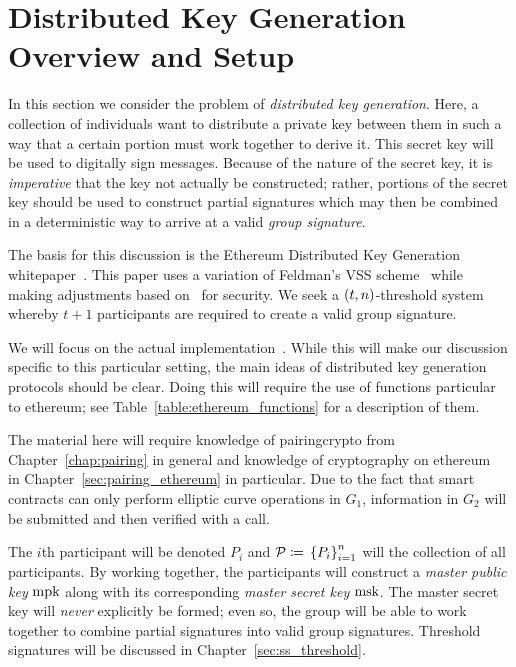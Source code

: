 \section{Distributed Key Generation Overview and Setup}
\label{sec:ss_dkg}

In this section we consider the problem of
\emph{\gls{distributed key generation}}.
Here, a collection of individuals want to distribute a private key
between them in such a way that a certain portion must work
together to derive it.
This secret key will be used to digitally sign messages.
Because of the nature of the secret key,
it is \emph{imperative} that the key not actually be constructed;
rather, portions of the secret key should be used to construct
partial signatures which may then be combined in a deterministic way
to arrive at a valid \emph{group signature}.

The basis for this discussion is the Ethereum Distributed Key Generation
whitepaper~\cite{ethdkg}.
This paper uses a variation of 
Feldman's VSS scheme~\cite{feldman1987practical}
while making adjustments
based on~\cite{gennaro1999secure,gennaro2002revisiting} for security.
We seek a $\left( t,n \right)$-threshold system
whereby $t+1$ participants are required to create a valid group signature.

We will focus on the actual implementation~\cite[Section 7]{ethdkg}.
While this will make our discussion specific to this particular setting,
the main ideas of \gls{distributed key generation} protocols should be clear.
Doing this will require the use of functions particular to \gls{ethereum};
see Table~\ref{table:ethereum_functions} for a description of them.

The material here will require knowledge of
\gls{pairingcrypto} from Chapter~\ref{chap:pairing} in general
and knowledge of cryptography on \gls{ethereum}~\cite{EthereumYellowpaper}
in Chapter~\ref{sec:pairing_ethereum} in particular.
Due to the fact that \glspl{smart contract} can only perform
\gls{elliptic curve}
operations in $G_{1}$, information in $G_{2}$ will be submitted
and then verified with a \PairingCheck{} call.



The $i$th participant will be denoted $P_{i}$
and $\mathcal{P} \coloneqq{} \left\{ P_{i} \right\}_{i=1}^{n}$
will the collection of all participants.
By working together, the participants will construct
a \emph{master public key} $\textrm{mpk}{}$ along with its corresponding
\emph{master secret key} $\textrm{msk}{}$.
The master secret key will \emph{never} explicitly be formed;
even so, the group will be able to work together to combine partial signatures
into valid group signatures.
Threshold signatures will be discussed in Chapter~\ref{sec:ss_threshold}.

